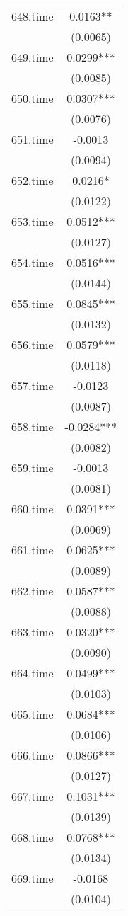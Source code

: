 \documentclass[]{article}
\begin{document}
\begin{tabular}{lc}
648.time & 0.0163** \\
 & (0.0065) \\
649.time & 0.0299*** \\
 & (0.0085) \\
650.time & 0.0307*** \\
 & (0.0076) \\
651.time & -0.0013 \\
 & (0.0094) \\
652.time & 0.0216* \\
 & (0.0122) \\
653.time & 0.0512*** \\
 & (0.0127) \\
654.time & 0.0516*** \\
 & (0.0144) \\
655.time & 0.0845*** \\
 & (0.0132) \\
656.time & 0.0579*** \\
 & (0.0118) \\
657.time & -0.0123 \\
 & (0.0087) \\
658.time & -0.0284*** \\
 & (0.0082) \\
659.time & -0.0013 \\
 & (0.0081) \\
660.time & 0.0391*** \\
 & (0.0069) \\
661.time & 0.0625*** \\
 & (0.0089) \\
662.time & 0.0587*** \\
 & (0.0088) \\
663.time & 0.0320*** \\
 & (0.0090) \\
664.time & 0.0499*** \\
 & (0.0103) \\
665.time & 0.0684*** \\
 & (0.0106) \\
666.time & 0.0866*** \\
 & (0.0127) \\
667.time & 0.1031*** \\
 & (0.0139) \\
668.time & 0.0768*** \\
 & (0.0134) \\
669.time & -0.0168 \\
 & (0.0104) \\

\end{tabular}
\end{document}
